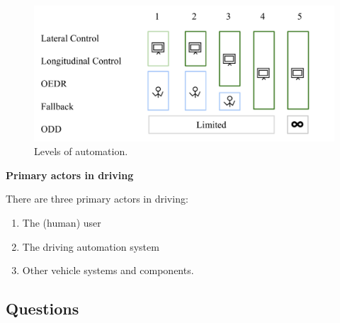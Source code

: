 \begin{figure}[!htb]
\begin{center}
\includegraphics[scale=0.280]{img/intro_self_driving/levels_of_automation.jpeg}
\end{center}
\caption{Levels of automation.}
\label{levels_of_automation}
\end{figure}

\begin{framed}
\theoremstyle{remark}
\begin{remark}{\textbf{Primary actors in driving}}

There are three primary actors in driving: 

\begin{enumerate}
\item The (human) user
\item The driving automation system
\item Other vehicle systems and components.
\end{enumerate}
\end{remark}
\end{framed}


\subsection{Questions}
\label{introduction_self_driving_cars_questions}

